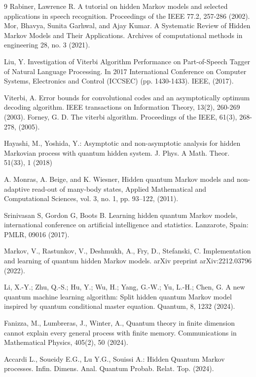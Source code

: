 \documentclass[12pt,a4paper]{article}
\begin{document}
\begin{thebibliography}{9}
 Rabiner, Lawrence R. A tutorial on hidden Markov models and selected applications in speech recognition. Proceedings of the IEEE 77.2, 257-286 (2002).
 Mor, Bhavya, Sunita Garhwal, and Ajay Kumar. A Systematic Review of Hidden Markov Models and Their Applications. Archives of computational methods in engineering 28, no. 3 (2021).

 Liu, Y.  Investigation of Viterbi Algorithm Performance on Part-of-Speech Tagger of Natural Language Processing. In 2017 International Conference on Computer Systems, Electronics and Control (ICCSEC) (pp. 1430-1433). IEEE, (2017).

 Viterbi, A. Error bounds for convolutional codes and an asymptotically optimum decoding algorithm. IEEE transactions on Information Theory, 13(2), 260-269 (2003).
 Forney, G. D. The viterbi algorithm. Proceedings of the IEEE, 61(3), 268-278,  (2005).


  Hayashi, M., Yoshida, Y.: Asymptotic and non-asymptotic analysis for hidden Markovian process with  quantum hidden system. J. Phys. A Math. Theor. 51(33), 1 (2018)

    A. Monras, A. Beige, and K. Wiesner, Hidden quantum Markov models and non-adaptive read-out of many-body states, Applied Mathematical and Computational Sciences, vol. 3, no. 1, pp. 93–122, (2011).

 Srinivasan S, Gordon G, Boots B. Learning hidden quantum Markov models,  international conference on artificial intelligence and statistics. Lanzarote, Spain: PMLR, 09016   (2017).

 Markov, V., Rastunkov, V., Deshmukh, A., Fry, D.,  Stefanski, C.  Implementation and learning of quantum hidden Markov models. arXiv preprint arXiv:2212.03796 (2022).

 Li, X.-Y.; Zhu, Q.-S.; Hu, Y.; Wu, H.; Yang, G.-W.; Yu, L.-H.; Chen, G. A new quantum machine learning algorithm: Split hidden  quantum Markov model inspired by quantum conditional master equation. Quantum, 8, 1232  (2024).

 Fanizza, M., Lumbreras, J.,   Winter, A., Quantum theory in finite dimension cannot explain every general process with finite memory. Communications in Mathematical Physics, 405(2), 50  (2024).

 Accardi L., Soueidy E.G., Lu Y.G., Souissi A.: Hidden Quantum Markov processes. Infin. Dimens. Anal. Quantum Probab. Relat. Top. (2024).


\end{thebibliography}
\end{document}
